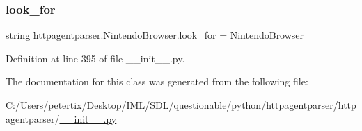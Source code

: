 \subsubsection{\texorpdfstring{look\+\_\+for}{look\_for}}
{\footnotesize\ttfamily string httpagentparser.\+Nintendo\+Browser.\+look\+\_\+for = \textquotesingle{}\hyperlink{classhttpagentparser_1_1_nintendo_browser}{Nintendo\+Browser}\textquotesingle{}\hspace{0.3cm}{\ttfamily [static]}}



Definition at line 395 of file \+\_\+\+\_\+init\+\_\+\+\_\+.\+py.



The documentation for this class was generated from the following file\+:\begin{DoxyCompactItemize}
\item 
C\+:/\+Users/petertix/\+Desktop/\+I\+M\+L/\+S\+D\+L/questionable/python/httpagentparser/httpagentparser/\hyperlink{____init_____8py}{\+\_\+\+\_\+init\+\_\+\+\_\+.\+py}\end{DoxyCompactItemize}
